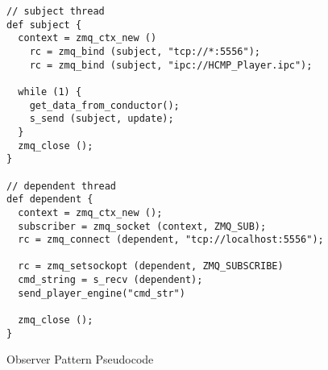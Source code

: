 \begin{table}[htdp]
\centering
\begin{lstlisting}
// subject thread 
def subject {
  context = zmq_ctx_new ()
	rc = zmq_bind (subject, "tcp://*:5556");
	rc = zmq_bind (subject, "ipc://HCMP_Player.ipc");

  while (1) {
    get_data_from_conductor();
    s_send (subject, update);
  }
  zmq_close ();
}

// dependent thread 
def dependent {
  context = zmq_ctx_new ();
  subscriber = zmq_socket (context, ZMQ_SUB);
  rc = zmq_connect (dependent, "tcp://localhost:5556");

  rc = zmq_setsockopt (dependent, ZMQ_SUBSCRIBE)
  cmd_string = s_recv (dependent);
  send_player_engine("cmd_str")

  zmq_close ();
}

\end{lstlisting}
\caption[Observer Pattern Pseudocode]{Observer Pattern Pseudocode}
\end{table}
